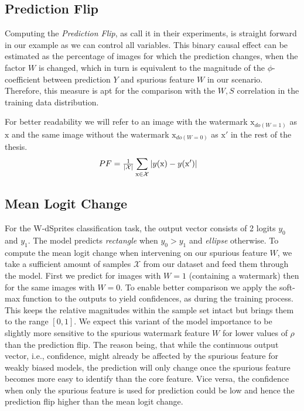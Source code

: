 \subsection{Prediction Flip}
Computing the \textit{Prediction Flip}, as \citeauthor{Sixt2022a} call it in their experiments, is straight forward in our example as we can control all variables. 
This binary causal effect can be estimated as the percentage of images for which the prediction changes, when the factor $W$ is changed, which in turn is equivalent to the magnitude of the $\phi$-coefficient between prediction $Y$ and spurious feature $W$ in our scenario. Therefore, this measure is apt for the comparison with the $W,S$ correlation in the training data distribution.

For better readability we will refer to an image with the watermark $\mathrm{x}_{do(W=1)}$ as $\mathrm{x}$ and the same image without the watermark $\mathrm{x}_{do(W=0)}$ as $\mathrm{x'}$ in the rest of the thesis.
\begin{align}
\displaystyle 
& PF =\tfrac{1}{|\mathcal{X}|} \sum_{\mathrm{x} \in \mathcal{X}} |y(\mathrm{x}) - y(\mathrm{x'}) | 
\end{align}

\subsection{Mean Logit Change}
For the W-dSprites classification task, the output vector consists of 2 logits $y_0$ and $y_1$. The model predicts \textit{rectangle} when $y_0 > y_1$ and \textit{ellipse} otherwise. To compute the mean logit change when intervening on our spurious feature $W$, we take a sufficient amount of samples $\mathcal{X}$ from our dataset and feed them through the model. First we predict for images with $W=1$ (containing a watermark) then for the same images with $W=0$. 
To enable better comparison we apply the soft-max function to the outputs to yield confidences, as during the training process. This keeps the relative magnitudes within the sample set intact but brings them to the range $[0,1]$. 
We expect this variant of the model importance to be slightly more sensitive to the spurious watermark feature $W$ for lower values of $\rho$ than the prediction flip. The reason being, that while the continuous output vector, i.e., confidence, might already be affected by the spurious feature for weakly biased models, the prediction will only change once the spurious feature becomes more easy to identify than the core feature. Vice versa, the confidence when only the spurious feature is used for prediction could be low and hence the prediction flip higher than the mean logit change.

